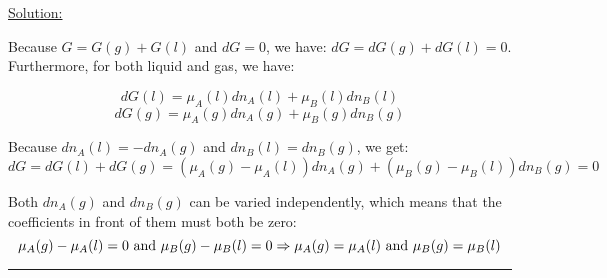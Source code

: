 \noindent
\underline{Solution:}

Because $G = G(g) + G(l)$ and $dG = 0$, we have: $dG = dG(g) + dG(l) = 0$. Furthermore, for both liquid and gas, we have:

$$dG(l) = \mu_A(l)dn_A(l) + \mu_B(l)dn_B(l)$$
$$dG(g) = \mu_A(g)dn_A(g) + \mu_B(g)dn_B(g)$$

Because $dn_A(l) = -dn_A(g)$ and $dn_B(l) = dn_B(g)$, we get:
$$dG = dG(l) + dG(g) = \left(\mu_A(g) - \mu_A(l)\right)dn_A(g) + \left(\mu_B(g) - \mu_B(l)\right)dn_B(g) = 0$$

Both $dn_A(g)$ and $dn_B(g)$ can be varied independently, which means that the coefficients in front of them must both be zero:
$$\mu_A(g) - \mu_A(l) = 0\textnormal{ and }\mu_B(g) - \mu_B(l) = 0\Rightarrow \mu_A(g) = \mu_A(l)\textnormal{ and }\mu_B(g) = \mu_B(l)$$

\hrule\vspace{0.5cm}

